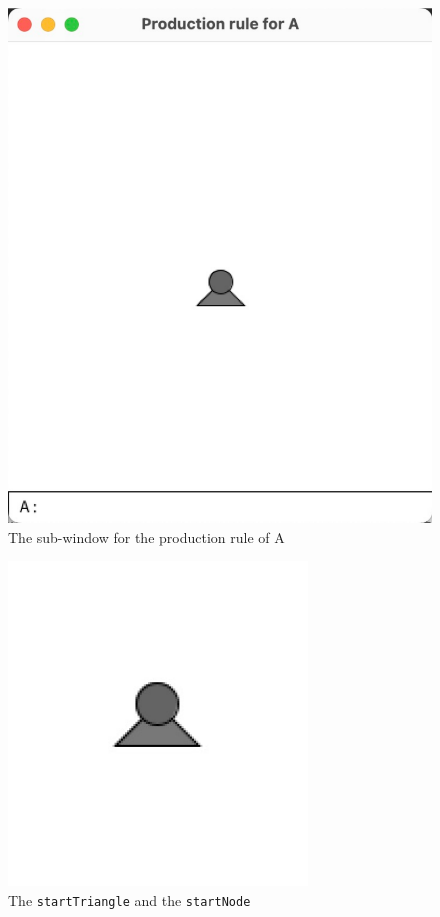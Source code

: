 \documentclass[12pt,twoside]{reedthesis}
\newcommand{\code}[1]{\texttt{#1}}
\begin{document}
		
	\begin{figure}[h!]
	\centering
	\includegraphics[scale=0.5, frame]{Images/HowItWorks2}
	\caption{The sub-window for the production rule of A}
	\label {Sub-Window}
	\end{figure}
	
	\begin{figure}[h]
	\centering
	\includegraphics[scale=1, frame]{Images/HowItWorks3}
	\caption{The \code{startTriangle} and the \code{startNode}}
	\label {HowItWorks3}
	\end{figure}
	
\end{document}
